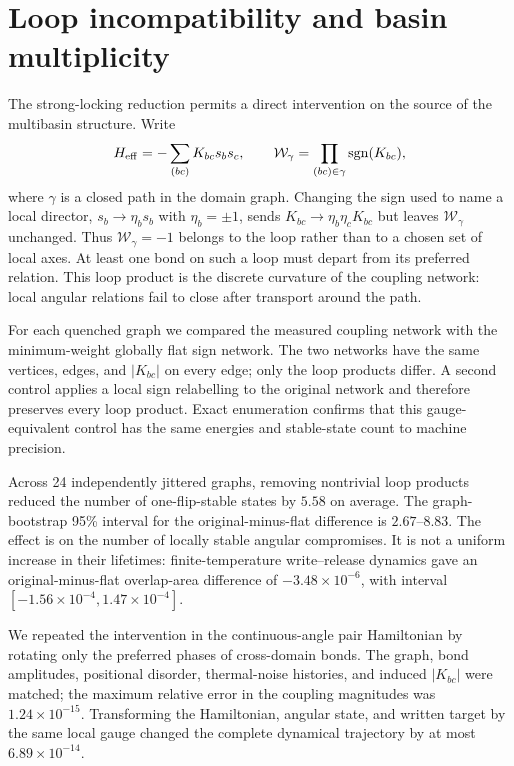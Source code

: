 \documentclass[aps,prl,onecolumn,superscriptaddress,nofootinbib]{revtex4-2}
\begin{document}
\section{Loop incompatibility and basin multiplicity}

The strong-locking reduction permits a direct intervention on the source of
the multibasin structure. Write
\begin{equation}
 H_{\rm eff}=-\sum_{(bc)}K_{bc}s_bs_c,
 \qquad
 \mathcal W_\gamma=\prod_{(bc)\in\gamma}{\rm sgn}(K_{bc}),
 \label{eq:supp-loop-holonomy}
\end{equation}
where \(\gamma\) is a closed path in the domain graph. Changing the sign used
to name a local director, \(s_b\to\eta_bs_b\) with \(\eta_b=\pm1\), sends
\(K_{bc}\to\eta_b\eta_cK_{bc}\) but leaves
\(\mathcal W_\gamma\) unchanged. Thus \(\mathcal W_\gamma=-1\) belongs to
the loop rather than to a chosen set of local axes. At least one bond on such
a loop must depart from its preferred relation. This loop product is the
discrete curvature of the coupling network: local angular relations fail to
close after transport around the path.

For each quenched graph we compared the measured coupling network with the
minimum-weight globally flat sign network. The two networks have the same
vertices, edges, and \(|K_{bc}|\) on every edge; only the loop products differ.
A second control applies a local sign relabelling to the original network and
therefore preserves every loop product. Exact enumeration confirms that this
gauge-equivalent control has the same energies and stable-state count to
machine precision.

Across 24 independently jittered graphs, removing nontrivial loop products
reduced the number of one-flip-stable states by \(5.58\) on average. The
graph-bootstrap 95\% interval for the original-minus-flat difference is
\(2.67\)--\(8.83\). The effect is on the number of locally stable angular
compromises. It is not a uniform increase in their lifetimes:
finite-temperature write--release dynamics gave an original-minus-flat
overlap-area difference of \(-3.48\times10^{-6}\), with interval
\([-1.56\times10^{-4},1.47\times10^{-4}]\).

We repeated the intervention in the continuous-angle pair Hamiltonian by
rotating only the preferred phases of cross-domain bonds. The graph, bond
amplitudes, positional disorder, thermal-noise histories, and induced
\(|K_{bc}|\) were matched; the maximum relative error in the coupling
magnitudes was \(1.24\times10^{-15}\). Transforming the Hamiltonian, angular
state, and written target by the same local gauge changed the complete
dynamical trajectory by at most \(6.89\times10^{-14}\).
\end{document}
